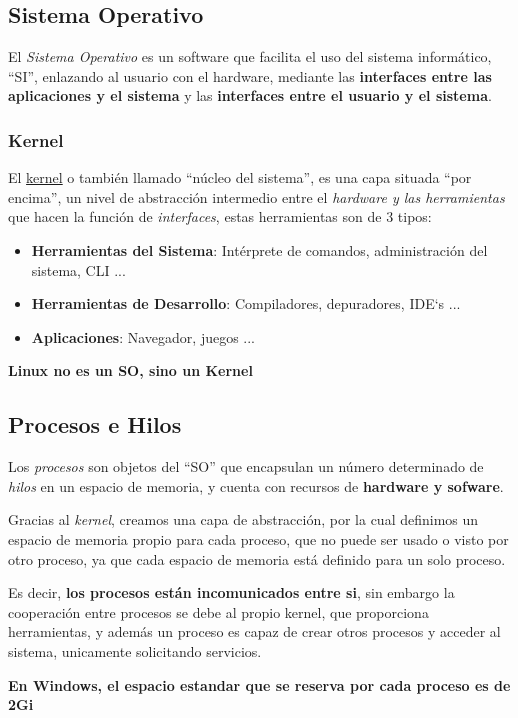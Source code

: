 \subsection{Sistema Operativo}
El \textit{Sistema Operativo} es un software que facilita el uso del sistema informático, ``SI'', enlazando al usuario con el hardware, mediante las \textbf{interfaces entre las aplicaciones y el sistema} y las \textbf{interfaces entre el usuario y el sistema}.
\subsubsection{Kernel}
El \underline{kernel} o también llamado ``núcleo del sistema'', es una capa situada ``por encima'', un nivel de abstracción intermedio entre el \textit{hardware y las herramientas} que hacen la función de \textit{interfaces}, estas herramientas son de 3 tipos:
\begin{itemize}
        \item \textbf{Herramientas del Sistema}: Intérprete de comandos, administración del sistema, CLI ...
        \item \textbf{Herramientas de Desarrollo}: Compiladores, depuradores, IDE`s ...
        \item \textbf{Aplicaciones}: Navegador, juegos ...
\end{itemize}
\textbf{Linux no es un SO, sino un Kernel}
\subsection{Procesos e Hilos}
Los \textit{procesos} son objetos del ``SO'' que encapsulan un número determinado de \textit{hilos} en un espacio de memoria, y cuenta con recursos de \textbf{hardware y sofware}.\par
Gracias al \textit{kernel}, creamos una capa de abstracción, por la cual definimos un espacio de memoria propio para cada proceso, que no puede ser usado o visto por otro proceso, ya que cada espacio de memoria está definido para un solo proceso. \par \vspace{.5cm}
Es decir, \textbf{los procesos están incomunicados entre si}, sin embargo la cooperación entre procesos se debe al propio kernel, que proporciona herramientas, y además un proceso es capaz de crear otros procesos y acceder al sistema, unicamente solicitando servicios.
\par \vspace{.5cm}  \textbf{En Windows, el espacio estandar que se reserva por cada proceso es de 2Gi}
